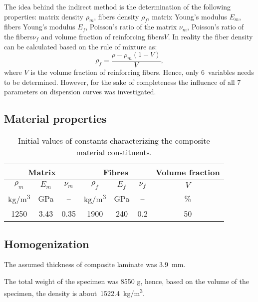 \documentclass[]{spie}  %
\begin{document}
The idea behind the indirect method is the determination of the following properties:  
matrix  density \(\rho_m\), fibers density \(\rho_f\), matrix Young's modulus \(E_m\), fibers 
Young's  modulus \(E_f\), Poisson's ratio of the matrix \(\nu_m\), Poisson's ratio of the 
fibers\(\nu_f\)  and  volume fraction of reinforcing fibers\(V\).  
In reality the fiber density can be calculated based on  the rule of mixture as:
\begin{equation}
\rho_f = \frac{\rho - \rho_m (1-V)}{V},
\label{eq:rho}
\end{equation}
where $V$ is the volume fraction of reinforcing fibers. Hence, only 6~variables needs to be 
determined. 
However, for the sake of completeness the influence of all 7 parameters on dispersion curves 
was investigated.

\subsection{Material properties}
\begin{table}[ht]
	\renewcommand{\arraystretch}{1.3}
	\caption{Initial values of constants characterizing the composite material 
		constituents.}
	\label{tab:matprop}
	\begin{center}	
		\begin{tabular}{ccccccc} 
			\toprule
			\multicolumn{3}{c}{\textbf{Matrix} }	& \multicolumn{3}{c}{\textbf{Fibres} } & 
			\textbf{Volume fraction}	 \\ 
			\midrule
			\(\rho_m\) & \(E_m\) & \(\nu_m\)  & \(\rho_f\) & \(E_f\) & \(\nu_f\) & \(V\)\\
			kg/m\textsuperscript{3} &GPa& --  & kg/m\textsuperscript{3}  & GPa& -- & \%\\ 
			\cmidrule(lr){1-3} \cmidrule(lr){4-6} \cmidrule(lr){7-7}
			1250 &3.43& 0.35& 1900 & 240 & 0.2 & 50\\
			\bottomrule 
		\end{tabular} 
	\end{center}
\end{table}

\subsection{Homogenization}
The assumed thickness of composite laminate was 3.9~mm. 

The total weight of the specimen was 8550 g, hence, based on the volume of the 
specimen, the density is about~1522.4~kg/m\textsuperscript{3}.
\end{document}
